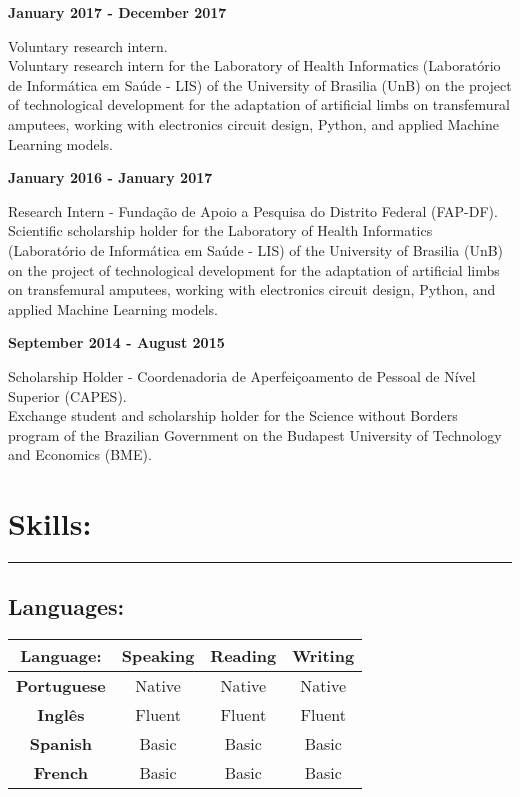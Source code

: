 \documentclass[11pt]{article}
\begin{document}
\textbf{January 2017 - December 2017}
\begin{addmargin}{0.5cm}
Voluntary research intern.\\
Voluntary research intern for the Laboratory of Health Informatics
(Laboratório de Informática em Saúde - LIS) of the University of
Brasilia (UnB) on the project of technological development for the adaptation of artificial limbs on transfemural amputees, working with electronics circuit design, Python, and applied Machine Learning models. \\
\end{addmargin}

\newpage
\textbf{January 2016 - January 2017}
\begin{addmargin}{0.5cm}
Research Intern - Fundação de Apoio a Pesquisa do Distrito Federal (FAP-DF).\\
Scientific scholarship holder for the Laboratory of Health Informatics
(Laboratório de Informática em Saúde - LIS) of the University of
Brasilia (UnB) on the project of technological development for the adaptation of artificial
limbs on transfemural amputees, working with electronics circuit design, Python, and applied
Machine Learning models. \\

\end{addmargin}

\textbf{September 2014 - August 2015}
\begin{addmargin}{0.5cm}
Scholarship Holder - Coordenadoria de Aperfeiçoamento de Pessoal de Nível Superior (CAPES). \\
Exchange student and scholarship holder for the Science without Borders program of the Brazilian
Government on the Budapest University of Technology and Economics (BME). \\
\end{addmargin}

\section{Skills:}
\hrule \vspace{0.1cm}

\subsection{Languages:}
\begin{center}
\begin{tabular}{c | c | c | c}
\hline
\textbf{Language:} & Speaking  & Reading & Writing \\
\hline
\hline
\textbf{Portuguese} &  Native & Native & Native  \\
\hline
\textbf{Inglês} &  Fluent & Fluent & Fluent  \\
\hline
\textbf{Spanish} & Basic & Basic & Basic \\
\hline
\textbf{French} & Basic & Basic & Basic \\
\hline
\end{tabular}
\end{center}
\end{document}
